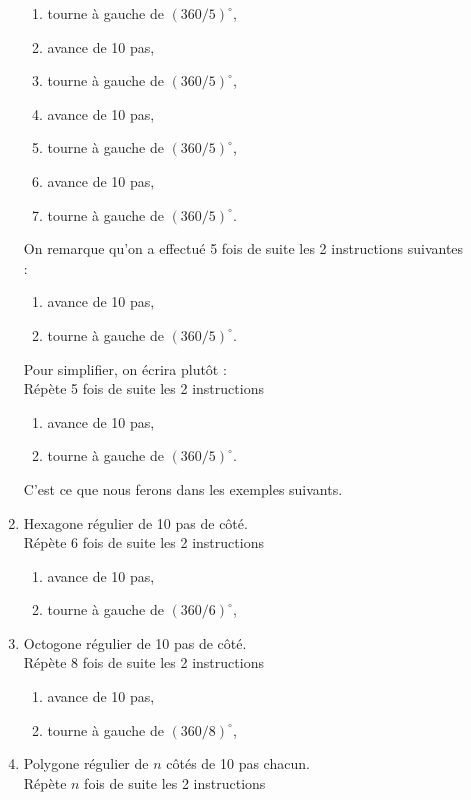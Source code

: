 \begin{description}
\begin{enumerate}
\begin{minipage}{6cm}
\begin{enumerate}
		\item tourne à gauche de $(360/5)^\circ$,
		\item avance de 10 pas,
		\item tourne à gauche de $(360/5)^\circ$,
		\item avance de 10 pas,
		\item tourne à gauche de $(360/5)^\circ$,
		\item avance de 10 pas,
		\item tourne à gauche de $(360/5)^\circ$.
		\end{enumerate}
		\end{minipage}
		\hfill
		\begin{minipage}{7cm}
		On remarque qu'on a effectué 5 fois de suite les 2 instructions 
		suivantes :
		\begin{enumerate}
		\item avance de 10 pas,
		\item tourne à gauche de $(360/5)^\circ$.
		\end{enumerate}
		Pour simplifier, on écrira plutôt :\\
		Répète 5 fois de suite les 2 instructions
		\begin{enumerate}
		\item avance de 10 pas,
		\item tourne à gauche de $(360/5)^\circ$.
		\end{enumerate}
		C'est ce que nous ferons dans les exemples suivants.
		\end{minipage}
	\item Hexagone régulier de 10 pas de côté.\\
		Répète 6 fois de suite les 2 instructions 
		\begin{enumerate}
		\item avance de 10 pas,
		\item tourne à gauche de $(360/6)^\circ$,
		\end{enumerate}
	\item Octogone régulier de 10 pas de côté.\\
		Répète 8 fois de suite les 2 instructions 
		\begin{enumerate}
		\item avance de 10 pas,
		\item tourne à gauche de $(360/8)^\circ$,
		\end{enumerate}
	\item Polygone régulier de $n$ côtés de 10 pas chacun.\\
		Répète $n$ fois de suite les 2 instructions 

\end{enumerate}
\end{description}
